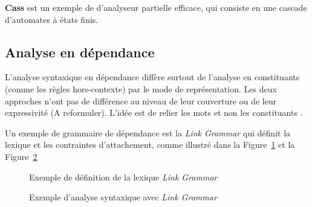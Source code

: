 \textbf{Cass} est un exemple de d'analyseur partielle efficace, qui consiste en une cascade d'automates à états finis.

\subsection{Analyse en dépendance}
L’analyse syntaxique en dépendance diffère surtout de l’analyse en constituants (comme les règles hors-contexte) par le mode de représentation. Les deux approches n’ont pas de différence au niveau de leur couverture ou de leur expressivité (A reformuler). L'idée est de relier les mots et non les constituants \citep{automatic-nlp}.

Un exemple de grammaire de dépendance est la \emph{Link Grammar} qui définit la lexique et les contraintes d'attachement, comme illustré dans la Figure~\ref{fig:link-grammar} et la Figure~\ref{fig:link-grammar-syntax}

\begin{figure}[htbp]
    \begin{center}
    \end{center}
    \caption{Exemple de définition de la lexique \emph{Link Grammar} \citep{automatic-nlp}}\label{fig:link-grammar}
\end{figure}

\begin{figure}[htbp]
    \begin{center}
    \end{center}
    \caption{Exemple d'analyse syntaxique avec \emph{Link Grammar} \citep{automatic-nlp}}\label{fig:link-grammar-syntax}
\end{figure}

